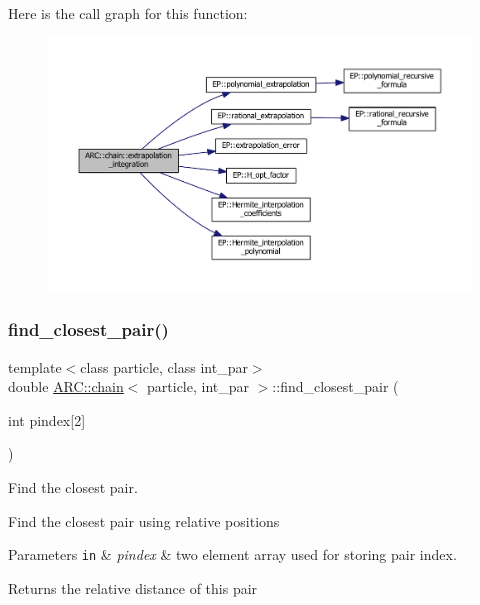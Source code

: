 Here is the call graph for this function\+:
\nopagebreak
\begin{figure}[H]
\begin{center}
\leavevmode
\includegraphics[width=350pt]{classARC_1_1chain_ae4d0002cceee2397101a43b3755f927e_cgraph}
\end{center}
\end{figure}
\hypertarget{classARC_1_1chain_a0c0cadba6cebb17e4d55b40ac98a608a}{}\label{classARC_1_1chain_a0c0cadba6cebb17e4d55b40ac98a608a} 
\subsubsection{\texorpdfstring{find\+\_\+closest\+\_\+pair()}{find\_closest\_pair()}}
{\footnotesize\ttfamily template$<$class particle, class int\+\_\+par$>$ \\
double \hyperlink{classARC_1_1chain}{A\+R\+C\+::chain}$<$ particle, int\+\_\+par $>$\+::find\+\_\+closest\+\_\+pair (\begin{DoxyParamCaption}\item[{int}]{pindex\mbox{[}2\mbox{]} }\end{DoxyParamCaption})\hspace{0.3cm}{\ttfamily [inline]}}



Find the closest pair. 

Find the closest pair using relative positions 
\begin{DoxyParams}[1]{Parameters}
\mbox{\tt in}  & {\em pindex} & two element array used for storing pair index. \\
\hline
\end{DoxyParams}
\begin{DoxyReturn}{Returns}
the relative distance of this pair 
\end{DoxyReturn}
\hypertarget{classARC_1_1chain_a7e4f81985bb88e0fb0fcc739b9790396}{}\label{classARC_1_1chain_a7e4f81985bb88e0fb0fcc739b9790396} 
